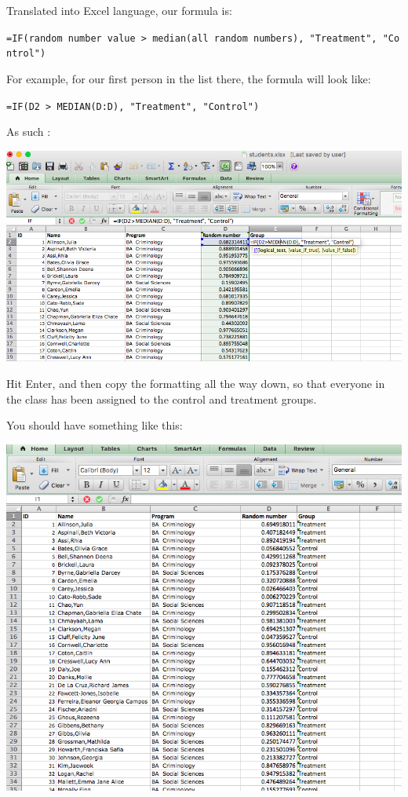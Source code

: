 \documentclass[]{book}
\theoremstyle{definition}
\theoremstyle{definition}
\theoremstyle{definition}
\theoremstyle{remark}
\begin{document}
Translated into Excel language, our formula is:

\texttt{=IF(random\ number\ value\ \textgreater{}\ median(all\ random\ numbers),\ "Treatment",\ "Control")}

For example, for our first person in the list there, the formula will
look like:

\texttt{=IF(D2\ \textgreater{}\ MEDIAN(D:D),\ "Treatment",\ "Control")}

As such :

\includegraphics{imgs/first_rand_assig.png}

Hit Enter, and then copy the formatting all the way down, so that
everyone in the class has been assigned to the control and treatment
groups.

You should have something like this:

\includegraphics{imgs/students_assigned.png}
\end{document}
